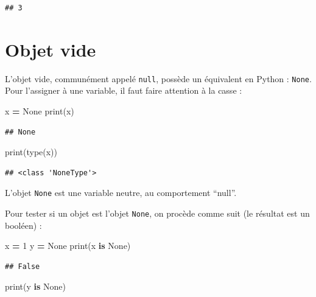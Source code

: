 \documentclass[12pt,]{book}
\newenvironment{Shaded}{\begin{snugshade}}{\end{snugshade}}
\newcommand{\KeywordTok}[1]{\textcolor[rgb]{0.13,0.29,0.53}{\textbf{#1}}}
\newcommand{\DecValTok}[1]{\textcolor[rgb]{0.00,0.00,0.81}{#1}}
\newcommand{\VariableTok}[1]{\textcolor[rgb]{0.00,0.00,0.00}{#1}}
\newcommand{\OperatorTok}[1]{\textcolor[rgb]{0.81,0.36,0.00}{\textbf{#1}}}
\newcommand{\BuiltInTok}[1]{#1}
\newcommand{\NormalTok}[1]{#1}
\numberwithin{equation}{section}
\numberwithin{countremarque}{section}
\begin{document}
\begin{lstlisting}
## 3
\end{lstlisting}

\section{Objet vide}\label{objet-vide}

L'objet vide, communément appelé \texttt{null}, possède un équivalent en
Python : \texttt{None}. Pour l'assigner à une variable, il faut faire
attention à la casse :

\begin{Shaded}
\begin{Highlighting}[]
\NormalTok{x }\OperatorTok{=} \VariableTok{None}
\BuiltInTok{print}\NormalTok{(x)}
\end{Highlighting}
\end{Shaded}

\begin{lstlisting}
## None
\end{lstlisting}

\begin{Shaded}
\begin{Highlighting}[]
\BuiltInTok{print}\NormalTok{(}\BuiltInTok{type}\NormalTok{(x))}
\end{Highlighting}
\end{Shaded}

\begin{lstlisting}
## <class 'NoneType'>
\end{lstlisting}

L'objet \texttt{None} est une variable neutre, au comportement ``null''.

Pour tester si un objet est l'objet \texttt{None}, on procède comme suit
(le résultat est un booléen) :

\begin{Shaded}
\begin{Highlighting}[]
\NormalTok{x }\OperatorTok{=} \DecValTok{1}
\NormalTok{y }\OperatorTok{=} \VariableTok{None}
\BuiltInTok{print}\NormalTok{(x }\KeywordTok{is} \VariableTok{None}\NormalTok{)}
\end{Highlighting}
\end{Shaded}

\begin{lstlisting}
## False
\end{lstlisting}

\begin{Shaded}
\begin{Highlighting}[]
\BuiltInTok{print}\NormalTok{(y }\KeywordTok{is} \VariableTok{None}\NormalTok{)}
\end{Highlighting}
\end{Shaded}
\end{document}
